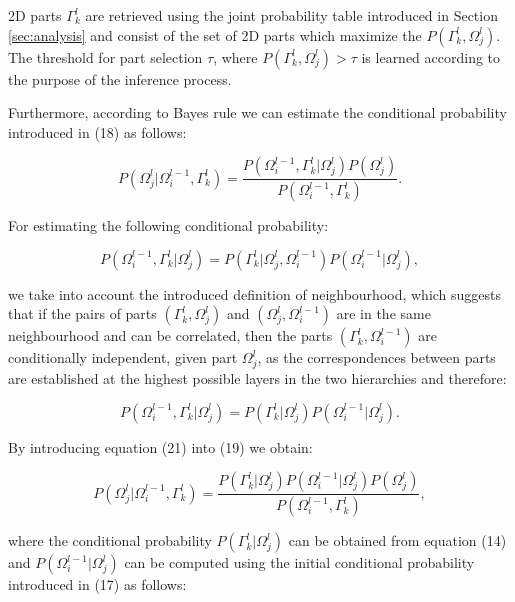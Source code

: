 \documentclass[runningheads]{llncs}
\begin{document}
2D parts $\Gamma_k^l$ are retrieved using the joint probability table introduced in Section \ref{sec:analysis} and consist of the set of 2D parts which maximize the $P(\Gamma_k^l,\Omega_j^l)$. The threshold for part selection $\tau$, where $P(\Gamma_k^l,\Omega_j^l)>\tau$ is learned according to the purpose of the inference process.

Furthermore, according to Bayes rule we can estimate the conditional probability introduced in (18) as follows:

\begin{equation}
 P(\Omega_j^{l} \vert \Omega_i^{l-1},\Gamma_k^l) = \frac{P(\Omega_i^{l-1},\Gamma_k^l \vert \Omega_j^{l})P(\Omega_j^{l})}{P(\Omega_i^{l-1},\Gamma_k^l)}.
\end{equation}

For estimating the following conditional probability:

\begin{equation}
 P(\Omega_i^{l-1},\Gamma_k^l \vert \Omega_j^{l}) =  P(\Gamma_k^l \vert \Omega_j^{l},\Omega_i^{l-1}) P(\Omega_i^{l-1} \vert \Omega_j^{l}),
\end{equation}

we take into account the introduced definition of neighbourhood, which suggests that if the pairs of parts $(\Gamma_k^l,\Omega_j^{l})$ and $(\Omega_j^{l},\Omega_i^{l-1})$ are in the same neighbourhood and can be correlated, then the parts $(\Gamma_k^l,\Omega_i^{l-1})$ are conditionally independent, given part $\Omega_j^{l}$, as the correspondences between parts are established at the highest possible layers in the two hierarchies and therefore: 

\begin{equation}
 P(\Omega_i^{l-1},\Gamma_k^l \vert \Omega_j^{l}) =  P(\Gamma_k^l \vert \Omega_j^{l}) P(\Omega_i^{l-1} \vert \Omega_j^{l}).
\end{equation}

By introducing equation (21) into (19) we obtain:

\begin{equation}
 P(\Omega_j^{l} \vert \Omega_i^{l-1},\Gamma_k^l) = \frac{P(\Gamma_k^l \vert \Omega_j^{l})P(\Omega_i^{l-1} \vert \Omega_j^{l})P(\Omega_j^{l})}{P(\Omega_i^{l-1},\Gamma_k^l)},
\end{equation}

where the conditional probability $P(\Gamma_k^l \vert \Omega_j^l)$ can be obtained from equation (14) and $P(\Omega_i^{l-1} \vert \Omega_j^{l})$ can be computed using the initial conditional probability introduced in (17) as follows:
\end{document}
